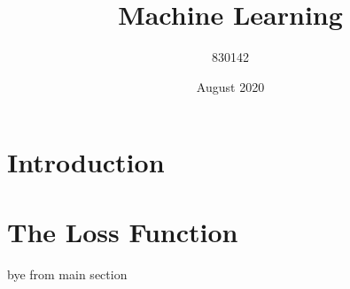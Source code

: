 \documentclass{article}
\title{Machine Learning}
\author{830142 }
\date{August 2020}
\begin{document}
\maketitle

\section{Introduction}


\section{The Loss Function}


bye from main section
\end{document}
